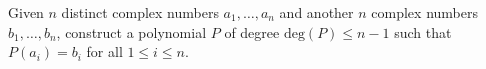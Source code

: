 Given $n$ distinct complex numbers $a_1, \dots, a_n$ and another $n$ complex numbers $b_1, \dots, b_n$, construct a 
polynomial $P$ of degree $\text{deg}(P) \leq n - 1$ such that $P(a_i) = b_i$ for all $1 \le i \le n$.

\begin{solution}
  \ \\
\end{solution}
